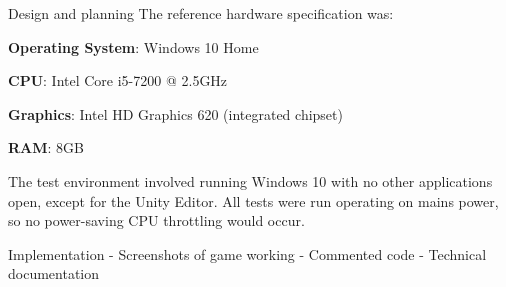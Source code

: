\documentclass[final]{cmpreport}
\begin{document}
\begin{section}{Design and planning}
The reference hardware specification was:
\begin{compactitem}
    \item{\textbf{Operating System}: Windows 10 Home}
    \item{\textbf{CPU}: Intel Core i5-7200 @ 2.5GHz}
    \item{\textbf{Graphics}: Intel HD Graphics 620 (integrated chipset)}
    \item{\textbf{RAM}: 8GB}
\end{compactitem}

The test environment involved running Windows 10 with no other applications open, except for the Unity Editor. All tests were run operating on mains power, so no power-saving CPU throttling would occur. 

\end{section}

\begin{section}{Implementation}
- Screenshots of game working
- Commented code
- Technical documentation

\end{section}
\end{document}
